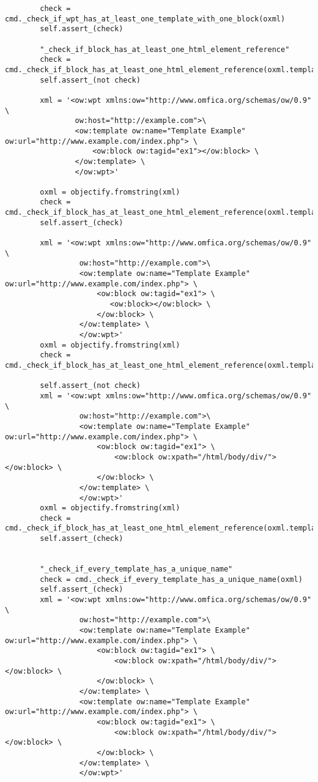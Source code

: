 \begin{lstlisting}
        check = cmd._check_if_wpt_has_at_least_one_template_with_one_block(oxml)
        self.assert_(check)
        
        "_check_if_block_has_at_least_one_html_element_reference"
        check = cmd._check_if_block_has_at_least_one_html_element_reference(oxml.template.block)
        self.assert_(not check)

        xml = '<ow:wpt xmlns:ow="http://www.omfica.org/schemas/ow/0.9" \
                ow:host="http://example.com">\
                <ow:template ow:name="Template Example" ow:url="http://www.example.com/index.php"> \
                    <ow:block ow:tagid="ex1"></ow:block> \
                </ow:template> \
                </ow:wpt>'

        oxml = objectify.fromstring(xml)
        check = cmd._check_if_block_has_at_least_one_html_element_reference(oxml.template.block) 
        self.assert_(check)

        xml = '<ow:wpt xmlns:ow="http://www.omfica.org/schemas/ow/0.9" \
                 ow:host="http://example.com">\
                 <ow:template ow:name="Template Example" ow:url="http://www.example.com/index.php"> \
                     <ow:block ow:tagid="ex1"> \
                        <ow:block></ow:block> \
                     </ow:block> \
                 </ow:template> \
                 </ow:wpt>'
        oxml = objectify.fromstring(xml)
        check = cmd._check_if_block_has_at_least_one_html_element_reference(oxml.template.block)

        self.assert_(not check)
        xml = '<ow:wpt xmlns:ow="http://www.omfica.org/schemas/ow/0.9" \
                 ow:host="http://example.com">\
                 <ow:template ow:name="Template Example" ow:url="http://www.example.com/index.php"> \
                     <ow:block ow:tagid="ex1"> \
                         <ow:block ow:xpath="/html/body/div/"></ow:block> \
                     </ow:block> \
                 </ow:template> \
                 </ow:wpt>'
        oxml = objectify.fromstring(xml)
        check = cmd._check_if_block_has_at_least_one_html_element_reference(oxml.template.block)
        self.assert_(check)


        "_check_if_every_template_has_a_unique_name"
        check = cmd._check_if_every_template_has_a_unique_name(oxml)
        self.assert_(check)
        xml = '<ow:wpt xmlns:ow="http://www.omfica.org/schemas/ow/0.9" \
                 ow:host="http://example.com">\
                 <ow:template ow:name="Template Example" ow:url="http://www.example.com/index.php"> \
                     <ow:block ow:tagid="ex1"> \
                         <ow:block ow:xpath="/html/body/div/"></ow:block> \
                     </ow:block> \
                 </ow:template> \
                 <ow:template ow:name="Template Example" ow:url="http://www.example.com/index.php"> \
                     <ow:block ow:tagid="ex1"> \
                         <ow:block ow:xpath="/html/body/div/"></ow:block> \
                     </ow:block> \
                 </ow:template> \
                 </ow:wpt>'


\end{lstlisting}
